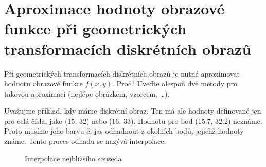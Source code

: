 \section{Aproximace hodnoty obrazové funkce při geometrických transformacích diskrétních obrazů}
Při geometrických transformacích diskrétních obrazů je nutné aproximovat hodnotu obrazové funkce $f(x,y)$. Proč? Uveďte 
alespoň dvě metody pro takovou aproximaci (nejlépe obrázkem, vzorcem, \dots).

Uvažujme příklad, kdy máme diskrétní obraz. Ten má ale hodnoty definované jen pro celá čísla, jako (15, 32) nebo 
(16, 33). Hodnotu pro bod (15.7, 32.2) neznáme. Proto musíme jeho barvu či jas odhadnout z okolních bodů, jejichž 
hodnoty známe. Tento proces odhadu se nazývá interpolace.

\begin{multicols}{2}
    \begin{figure}[H]
        \caption{Interpolace nejbližšího souseda}
    \end{figure}

    \begin{figure}[H]
\end{figure}
\end{multicols}

